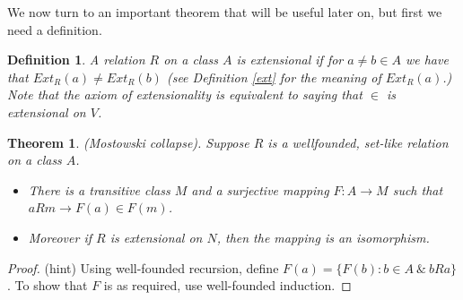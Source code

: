 \documentclass[a4paper,11pt,oneside]{mybook}
\def\pw{{{\mathcal P}}}
\theoremstyle{theorem}
\newtheorem{theorem}[subsection]{Theorem}
\newtheorem{definition}[subsection]{Definition}
\theoremstyle{example}
\begin{document}
{We now turn to an important theorem that will be useful later on, but first we need a definition.

\begin{definition}
A relation $R$ on a class $A$ is extensional if for $a\neq b\in A$ we have that $Ext_R(a)\neq Ext_R(b)$ (see Definition \ref{ext} for the
meaning of $Ext_R(a)$.) Note that the axiom of extensionality is equivalent to saying that $\in$ is extensional on $V$.
\end{definition}

\begin{theorem}\label{mostowski}
{\rm (Mostowski collapse).} Suppose $R$ is a wellfounded, set-like relation on a class $A$.
\begin{itemize}
\item[(i)] There is a transitive class $M$ and a surjective mapping $F:A\to M$ such that $aRm\rightarrow F(a)\in F(m)$.
\item[(ii)] Moreover if $R$ is extensional on $N$, then the mapping is an isomorphism.
\end{itemize}
\end{theorem}

\begin{proof}
(hint) Using well-founded recursion, define $F(a)=\{F(b):b\in A\ \&\ bRa\}$. To show that $F$ is as required, use well-founded induction.
\end{proof}

%


}
\end{document}
